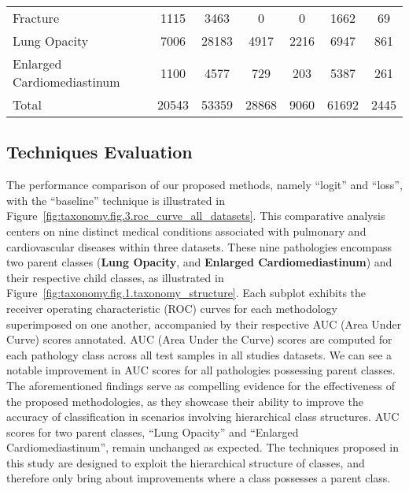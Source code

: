 \documentclass[final,1p,times,authoryear]{elsarticle}
\begin{document}
\begin{table}[htbp]
\begin{tabular}{lcccccc}
        Fracture           & 1115 & 3463  & 0    & 0    & 1662 & 69  \\
        Lung Opacity& 7006 & 28183 &
        \cellcolor{table_row_highlight}4917 &
        \cellcolor{table_row_highlight}2216 &
        \cellcolor{table_row_highlight}6947 &
        \cellcolor{table_row_highlight}861 \\
        Enlarged Cardiomediastinum & 1100 & 4577 &
        \cellcolor{table_row_highlight}729 &
        \cellcolor{table_row_highlight}203 &
        \cellcolor{table_row_highlight}5387 &
        \cellcolor{table_row_highlight}261 \\
        \rowcolor[HTML]{79A8A4}
        Total & 20543 & 53359 & 28868 & 9060 & 61692 & 2445
    \end{tabular}
\end{table}
%

\subsection{Techniques Evaluation}
The performance comparison of our proposed methods, namely ``logit'' and ``loss'', with the ``baseline'' technique is illustrated in Figure~\ref{fig:taxonomy.fig.3.roc_curve_all_datasets}. This comparative analysis centers on nine distinct medical conditions associated with pulmonary and cardiovascular diseases within three datasets. These nine pathologies encompass two parent classes (\textbf{Lung Opacity}, and \textbf{Enlarged Cardiomediastinum}) and their respective child classes, as illustrated in Figure~\ref{fig:taxonomy.fig.1.taxonomy_structure}. Each subplot exhibits the receiver operating characteristic (ROC) curves for each methodology superimposed on one another, accompanied by their respective AUC (Area Under Curve) scores annotated. AUC (Area Under the Curve) scores are computed for each pathology class across all test samples in all studies datasets. We can see a notable improvement in AUC scores for all pathologies possessing parent classes. The aforementioned findings serve as compelling evidence for the effectiveness of the proposed methodologies, as they showcase their ability to improve the accuracy of classification in scenarios involving hierarchical class structures. AUC scores for two parent classes, ``Lung Opacity'' and ``Enlarged Cardiomediastinum'', remain unchanged as expected. The techniques proposed in this study are designed to exploit the hierarchical structure of classes, and therefore only bring about improvements where a class possesses a parent class.
\end{document}
